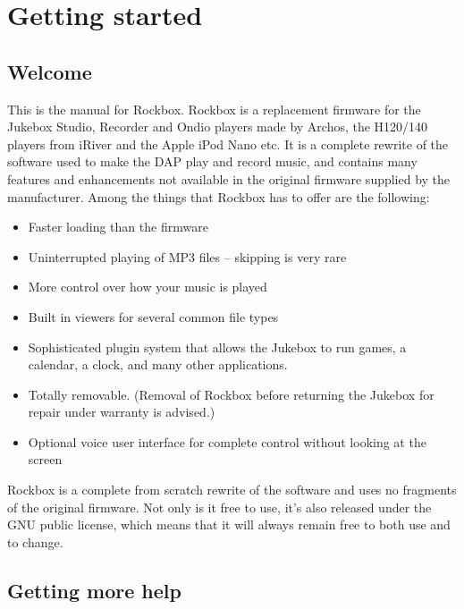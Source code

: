 \chapter{Getting started}
\section{Welcome}
This is the manual for Rockbox.  Rockbox is a replacement firmware for the
Jukebox Studio, Recorder and Ondio players made by Archos, the H120/140
players from iRiver and the Apple iPod Nano etc.  It is a complete rewrite of
the software used to make the DAP play and record music, and contains many
features and enhancements not available in the original firmware supplied by
the manufacturer.  Among the things that Rockbox has to offer are the
following:

\begin{itemize}
\item Faster loading than the \playername firmware
\item Uninterrupted playing of MP3 files {--} skipping is very rare
\item More control over how your music is played
\item Built in viewers for several common file types
\item Sophisticated plugin system that allows the Jukebox to run games,
a calendar, a clock, and many other applications.
\item Totally removable. (Removal of Rockbox before returning the
Jukebox for repair under warranty is advised.)
\item Optional voice user interface for complete control without looking
at the screen
\end{itemize}
Rockbox is a complete from scratch rewrite of the \playername software and
uses no fragments of the original firmware.  Not only is it free to
use, it's also released under the GNU public license,
which means that it will always remain free to both use and to change.


\section{Getting more help}

